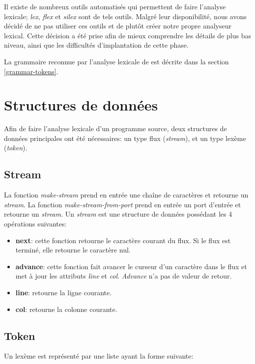\documentclass[11pt]{report}
\begin{document}
Il existe de nombreux outils automatisés qui permettent de faire
l'analyse lexicale; \emph{lex}, \emph{flex} et \emph{silex} sont de
tels outils.  Malgré leur disponibilité, nous avons décidé de ne pas
utiliser ces outils et de plutôt créer notre propre analyseur lexical.
Cette décision a été prise afin de mieux comprendre les détails de
plus bas niveau, ainsi que les difficultés d'implantation de cette
phase.

La grammaire reconnue par l'analyse lexicale de \sins{} est décrite
dans la section \ref{grammar-tokens}.

\section{Structures de données}

Afin de faire l'analyse lexicale d'un programme source, deux
structures de données principales ont été nécessaires: un type flux
(\emph{stream}), et un type lexème (\emph{token}).

\subsection{Stream}

La fonction \emph{make-stream} prend en entrée une chaîne de
caractères et retourne un \emph{stream}.  La fonction
\emph{make-stream-from-port} prend en entrée un port d'entrée et
retourne un \emph{stream}.  Un \emph{stream} est une structure de
données possédant les 4 opérations suivantes:

\begin{itemize}
\item {\bf next}: cette fonction retourne le caractère courant du
  flux.  Si le flux est terminé, elle retourne le caractère nul.
\item {\bf advance}: cette fonction fait avancer le curseur d'un
  caractère dans le flux et met à jour les attributs \emph{line} et
  \emph{col}.  \emph{Advance} n'a pas de valeur de retour.
\item {\bf line}: retourne la ligne courante.
\item {\bf col}: retourne la colonne courante.
\end{itemize}

\subsection{Token}

Un lexème est représenté par une liste ayant la forme suivante:
\end{document}
